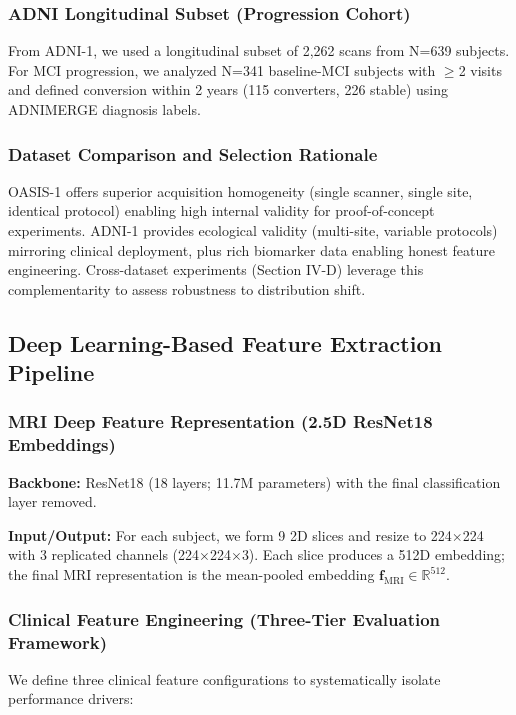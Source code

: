 \documentclass[conference]{IEEEtran}
\begin{document}
\subsubsection{ADNI Longitudinal Subset (Progression Cohort)}
From ADNI-1, we used a longitudinal subset of 2,262 scans from N=639 subjects. For MCI progression, we analyzed N=341 baseline-MCI subjects with $\geq$2 visits and defined conversion within 2 years (115 converters, 226 stable) using ADNIMERGE diagnosis labels.

\subsubsection{Dataset Comparison and Selection Rationale}
OASIS-1 offers superior acquisition homogeneity (single scanner, single site, identical protocol) enabling high internal validity for proof-of-concept experiments. ADNI-1 provides ecological validity (multi-site, variable protocols) mirroring clinical deployment, plus rich biomarker data enabling honest feature engineering. Cross-dataset experiments (Section IV-D) leverage this complementarity to assess robustness to distribution shift.

\subsection{Deep Learning-Based Feature Extraction Pipeline}

\subsubsection{MRI Deep Feature Representation (2.5D ResNet18 Embeddings)}
\textbf{Backbone:} ResNet18 \cite{He2016} (18 layers; 11.7M parameters) with the final classification layer removed.

\textbf{Input/Output:} For each subject, we form 9 2D slices and resize to 224$\times$224 with 3 replicated channels (224$\times$224$\times$3). Each slice produces a 512D embedding; the final MRI representation is the mean-pooled embedding $\mathbf{f}_{\text{MRI}}\in\mathbb{R}^{512}$.

\subsubsection{Clinical Feature Engineering (Three-Tier Evaluation Framework)}

We define three clinical feature configurations to systematically isolate performance drivers:
\end{document}
